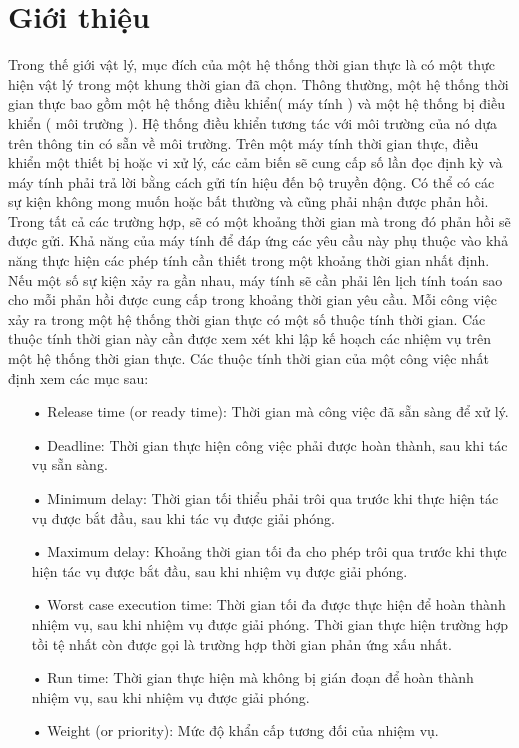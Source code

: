 \documentclass[a4paper,10pt]{report}
\begin{document}
\section{Giới thiệu}
Trong thế giới vật lý, mục đích của một hệ thống thời gian thực là có một thực hiện vật lý trong một khung thời gian đã chọn. Thông thường, một hệ thống thời gian thực bao gồm một hệ thống điều khiển( máy tính ) và một hệ thống bị điều khiển ( môi trường ). Hệ thống điều  khiển tương tác với môi trường của nó dựa trên thông tin có sẵn về môi trường. Trên một máy tính thời gian thực, điều khiển một thiết bị hoặc vi xử lý, các cảm biến sẽ cung cấp số lần đọc định kỳ và máy tính phải trả lời bằng cách gửi tín hiệu đến bộ truyền động. Có thể có các sự kiện không mong muốn hoặc bất thường và cũng phải nhận được phản hồi. Trong tất cả các trường hợp, sẽ có một khoảng thời gian mà trong đó phản hồi sẽ được gửi. Khả năng của máy tính để đáp ứng các yêu cầu này phụ thuộc vào khả năng thực hiện các phép tính cần thiết trong một khoảng thời gian nhất định. Nếu một số sự kiện xảy ra gần nhau, máy tính sẽ cần phải lên lịch tính toán sao cho mỗi phản hồi được cung cấp trong khoảng thời gian yêu cầu. Mỗi công việc xảy ra trong một hệ thống thời gian thực có một số thuộc tính thời gian. Các thuộc tính thời gian này cần được xem xét khi lập kế hoạch các nhiệm vụ trên một hệ thống thời gian thực. Các thuộc tính thời gian của một công việc nhất định xem các mục sau:
\begin{itemize}
\item[•] Release time (or ready time): Thời gian mà công việc đã sẵn sàng để xử lý.
\item[•] Deadline: Thời gian thực hiện công việc phải được hoàn thành, sau khi tác vụ sẵn sàng.
\item[•] Minimum delay: Thời gian tối thiểu phải trôi qua trước khi thực hiện tác vụ được bắt đầu, sau khi tác vụ được giải phóng.
\item[•] Maximum delay: Khoảng thời gian tối đa cho phép trôi qua trước khi thực hiện tác vụ được bắt đầu, sau khi nhiệm vụ được giải phóng.
\item[•] Worst case execution time: Thời gian tối đa được thực hiện để hoàn thành nhiệm vụ, sau khi nhiệm vụ được giải phóng. Thời gian thực hiện trường hợp tồi tệ nhất còn được gọi là trường hợp thời gian phản ứng xấu nhất.
\item[•] Run time: Thời gian thực hiện mà không bị gián đoạn để hoàn thành nhiệm vụ, sau khi nhiệm vụ được giải phóng.
\item[•] Weight (or priority): Mức độ khẩn cấp tương đối của nhiệm vụ.
\end{itemize}
\end{document}
